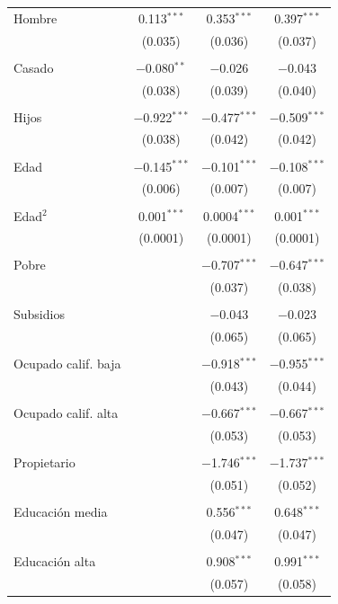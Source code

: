 \documentclass[12pt,a4paper]{article}
\begin{document}
\begin{table}[!htbp]
\begin{tabular}{@{\extracolsep{5pt}}lccc}
Hombre & 0.113$^{***}$ & 0.353$^{***}$ & 0.397$^{***}$ \\ 
  & (0.035) & (0.036) & (0.037) \\ 
  & & & \\ 
 Casado & $-$0.080$^{**}$ & $-$0.026 & $-$0.043 \\ 
  & (0.038) & (0.039) & (0.040) \\ 
  & & & \\ 
 Hijos & $-$0.922$^{***}$ & $-$0.477$^{***}$ & $-$0.509$^{***}$ \\ 
  & (0.038) & (0.042) & (0.042) \\ 
  & & & \\ 
 Edad & $-$0.145$^{***}$ & $-$0.101$^{***}$ & $-$0.108$^{***}$ \\ 
  & (0.006) & (0.007) & (0.007) \\ 
  & & & \\ 
 Edad$^2$ & 0.001$^{***}$ & 0.0004$^{***}$ & 0.001$^{***}$ \\ 
  & (0.0001) & (0.0001) & (0.0001) \\ 
  & & & \\ 
 Pobre &  & $-$0.707$^{***}$ & $-$0.647$^{***}$ \\ 
  &  & (0.037) & (0.038) \\ 
  & & & \\ 
 Subsidios &  & $-$0.043 & $-$0.023 \\ 
  &  & (0.065) & (0.065) \\ 
  & & & \\ 
 Ocupado calif. baja &  & $-$0.918$^{***}$ & $-$0.955$^{***}$ \\ 
  &  & (0.043) & (0.044) \\ 
  & & & \\ 
 Ocupado calif. alta &  & $-$0.667$^{***}$ & $-$0.667$^{***}$ \\ 
  &  & (0.053) & (0.053) \\ 
  & & & \\ 
 Propietario &  & $-$1.746$^{***}$ & $-$1.737$^{***}$ \\ 
  &  & (0.051) & (0.052) \\ 
  & & & \\ 
 Educación media &  & 0.556$^{***}$ & 0.648$^{***}$ \\ 
  &  & (0.047) & (0.047) \\ 
  & & & \\ 
 Educación alta &  & 0.908$^{***}$ & 0.991$^{***}$ \\ 
  &  & (0.057) & (0.058) \\ 

\end{tabular}
\end{table}
\end{document}
